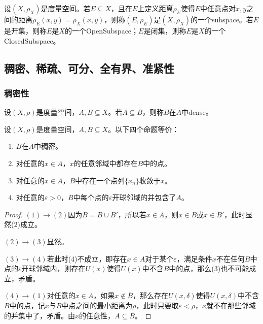 \begin{definition}
	设$(X,\rho_X)$是度量空间。若$E\subseteq X$，且在$E$上定义距离$\rho_E$使得$E$中任意点对$x,y$之间的距离$\rho_E(x,y)=\rho_X(x,y)$，则称$(E,\rho_E)$是$(X,\rho_X)$的一个\gls{subspace}。若$E$是开集，则称$E$是$X$的一个\gls{OpenSubspace}；$E$是闭集，则称$E$是$X$的一个\gls{ClosedSubspace}。
\end{definition}

\subsection{稠密、稀疏、可分、全有界、准紧性}
\subsubsection{稠密性}
\begin{definition}
	设$(X,\rho)$是度量空间，$A,B\subseteq X$。若$A\subseteq\overline{B}$，则称$B$在$A$中\gls{dense}。
\end{definition}
\begin{theorem}\label{theo:Density}
	设$(X,\rho)$是度量空间，$A,B\subseteq X$。以下四个命题等价：
	\begin{enumerate}
		\item $B$在$A$中稠密。
		\item 对任意的$ x\in A$，$x$的任意邻域中都存在$B$中的点。
		\item 对任意的$ x\in A$，$B$中存在一个点列$\{x_n\}$收敛于$x$。
		\item 对任意的$\varepsilon>0$，$B$中每个点的$\varepsilon$开球邻域的并包含了$A$。
	\end{enumerate}
\end{theorem}
\begin{proof}
	$(1)\to(2)$因为$\overline{B}=B\cup B'$，所以若$x\in A$，则$x\in B$或$x\in B'$，此时显然(2)成立。\par
	$(2)\to(3)$显然。\par
	$(3)\to(4)$若此时(4)不成立，即存在$x\in A$对于某个$\varepsilon$，满足条件$x$不在任何$B$中点的$\varepsilon$开球邻域内，则存在$U(x)$使得$U(x)$中不含$B$中的点，那么(3)也不可能成立，矛盾。\par
	$(4)\to(1)$对任意的$ x\in A$，如果$x\notin \overline{B}$，那么存在$U(x,\delta)$使得$U(x,\delta)$中不含$B$中的点，记$x$与$B$中点之间的最小距离为$\rho$，此时只要取$\varepsilon<\rho$，$x$就不在那些邻域的并集中了，矛盾。由$x$的任意性，$A\subseteq\overline{B}$。
\end{proof}
